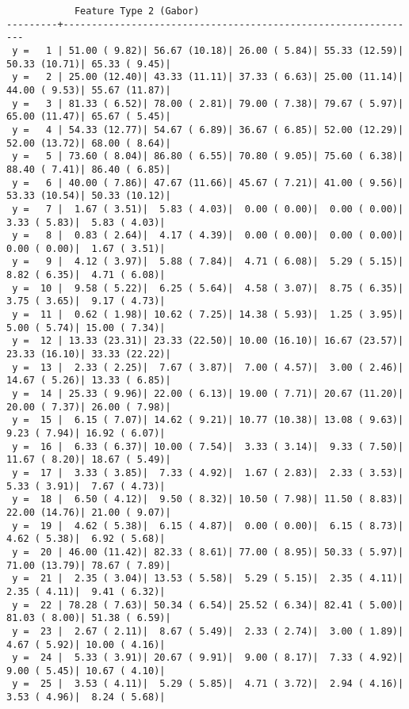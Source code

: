 \documentclass[10pt]{article}
\begin{document}
\begin{Verbatim}
            Feature Type 2 (Gabor)
---------+---------------------------------------------------------------
 y =   1 | 51.00 ( 9.82)| 56.67 (10.18)| 26.00 ( 5.84)| 55.33 (12.59)| 50.33 (10.71)| 65.33 ( 9.45)|
 y =   2 | 25.00 (12.40)| 43.33 (11.11)| 37.33 ( 6.63)| 25.00 (11.14)| 44.00 ( 9.53)| 55.67 (11.87)|
 y =   3 | 81.33 ( 6.52)| 78.00 ( 2.81)| 79.00 ( 7.38)| 79.67 ( 5.97)| 65.00 (11.47)| 65.67 ( 5.45)|
 y =   4 | 54.33 (12.77)| 54.67 ( 6.89)| 36.67 ( 6.85)| 52.00 (12.29)| 52.00 (13.72)| 68.00 ( 8.64)|
 y =   5 | 73.60 ( 8.04)| 86.80 ( 6.55)| 70.80 ( 9.05)| 75.60 ( 6.38)| 88.40 ( 7.41)| 86.40 ( 6.85)|
 y =   6 | 40.00 ( 7.86)| 47.67 (11.66)| 45.67 ( 7.21)| 41.00 ( 9.56)| 53.33 (10.54)| 50.33 (10.12)|
 y =   7 |  1.67 ( 3.51)|  5.83 ( 4.03)|  0.00 ( 0.00)|  0.00 ( 0.00)|  3.33 ( 5.83)|  5.83 ( 4.03)|
 y =   8 |  0.83 ( 2.64)|  4.17 ( 4.39)|  0.00 ( 0.00)|  0.00 ( 0.00)|  0.00 ( 0.00)|  1.67 ( 3.51)|
 y =   9 |  4.12 ( 3.97)|  5.88 ( 7.84)|  4.71 ( 6.08)|  5.29 ( 5.15)|  8.82 ( 6.35)|  4.71 ( 6.08)|
 y =  10 |  9.58 ( 5.22)|  6.25 ( 5.64)|  4.58 ( 3.07)|  8.75 ( 6.35)|  3.75 ( 3.65)|  9.17 ( 4.73)|
 y =  11 |  0.62 ( 1.98)| 10.62 ( 7.25)| 14.38 ( 5.93)|  1.25 ( 3.95)|  5.00 ( 5.74)| 15.00 ( 7.34)|
 y =  12 | 13.33 (23.31)| 23.33 (22.50)| 10.00 (16.10)| 16.67 (23.57)| 23.33 (16.10)| 33.33 (22.22)|
 y =  13 |  2.33 ( 2.25)|  7.67 ( 3.87)|  7.00 ( 4.57)|  3.00 ( 2.46)| 14.67 ( 5.26)| 13.33 ( 6.85)|
 y =  14 | 25.33 ( 9.96)| 22.00 ( 6.13)| 19.00 ( 7.71)| 20.67 (11.20)| 20.00 ( 7.37)| 26.00 ( 7.98)|
 y =  15 |  6.15 ( 7.07)| 14.62 ( 9.21)| 10.77 (10.38)| 13.08 ( 9.63)|  9.23 ( 7.94)| 16.92 ( 6.07)|
 y =  16 |  6.33 ( 6.37)| 10.00 ( 7.54)|  3.33 ( 3.14)|  9.33 ( 7.50)| 11.67 ( 8.20)| 18.67 ( 5.49)|
 y =  17 |  3.33 ( 3.85)|  7.33 ( 4.92)|  1.67 ( 2.83)|  2.33 ( 3.53)|  5.33 ( 3.91)|  7.67 ( 4.73)|
 y =  18 |  6.50 ( 4.12)|  9.50 ( 8.32)| 10.50 ( 7.98)| 11.50 ( 8.83)| 22.00 (14.76)| 21.00 ( 9.07)|
 y =  19 |  4.62 ( 5.38)|  6.15 ( 4.87)|  0.00 ( 0.00)|  6.15 ( 8.73)|  4.62 ( 5.38)|  6.92 ( 5.68)|
 y =  20 | 46.00 (11.42)| 82.33 ( 8.61)| 77.00 ( 8.95)| 50.33 ( 5.97)| 71.00 (13.79)| 78.67 ( 7.89)|
 y =  21 |  2.35 ( 3.04)| 13.53 ( 5.58)|  5.29 ( 5.15)|  2.35 ( 4.11)|  2.35 ( 4.11)|  9.41 ( 6.32)|
 y =  22 | 78.28 ( 7.63)| 50.34 ( 6.54)| 25.52 ( 6.34)| 82.41 ( 5.00)| 81.03 ( 8.00)| 51.38 ( 6.59)|
 y =  23 |  2.67 ( 2.11)|  8.67 ( 5.49)|  2.33 ( 2.74)|  3.00 ( 1.89)|  4.67 ( 5.92)| 10.00 ( 4.16)|
 y =  24 |  5.33 ( 3.91)| 20.67 ( 9.91)|  9.00 ( 8.17)|  7.33 ( 4.92)|  9.00 ( 5.45)| 10.67 ( 4.10)|
 y =  25 |  3.53 ( 4.11)|  5.29 ( 5.85)|  4.71 ( 3.72)|  2.94 ( 4.16)|  3.53 ( 4.96)|  8.24 ( 5.68)|

\end{Verbatim}
\end{document}
